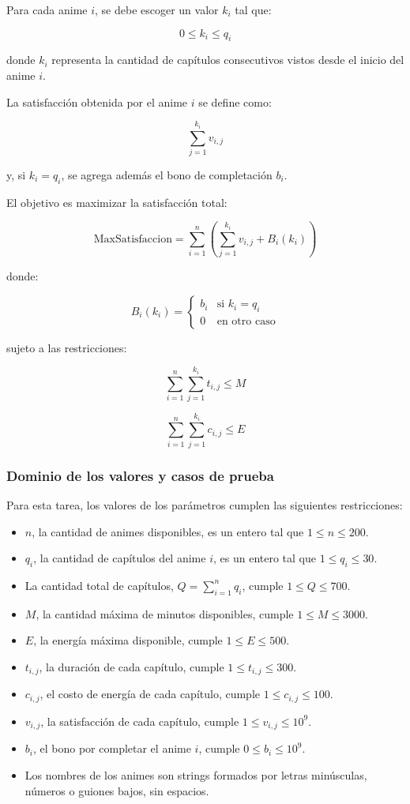 Para cada anime $i$, se debe escoger un valor $k_i$ tal que:

\[
0 \leq k_i \leq q_i
\]

donde $k_i$ representa la cantidad de capítulos consecutivos vistos desde el inicio del anime $i$.

La satisfacción obtenida por el anime $i$ se define como:

\[
\sum_{j=1}^{k_i} v_{i,j}
\]

y, si $k_i = q_i$, se agrega además el bono de completación $b_i$.

El objetivo es maximizar la satisfacción total:

\[
\text{MaxSatisfaccion}
=
\sum_{i=1}^{n}
\left(
\sum_{j=1}^{k_i} v_{i,j}
+
B_i(k_i)
\right)
\]

donde:

\[
B_i(k_i)=
\begin{cases}
b_i & \text{si } k_i=q_i\\
0 & \text{en otro caso}
\end{cases}
\]

sujeto a las restricciones:

\[
\sum_{i=1}^{n}\sum_{j=1}^{k_i} t_{i,j} \leq M
\]

\[
\sum_{i=1}^{n}\sum_{j=1}^{k_i} c_{i,j} \leq E
\]

\subsubsection*{Dominio de los valores y casos de prueba}

Para esta tarea, los valores de los parámetros cumplen las siguientes restricciones:

\begin{itemize}
    \item $n$, la cantidad de animes disponibles, es un entero tal que $1 \leq n \leq 200$.
    \item $q_i$, la cantidad de capítulos del anime $i$, es un entero tal que $1 \leq q_i \leq 30$.
    \item La cantidad total de capítulos, $Q=\sum_{i=1}^{n} q_i$, cumple $1 \leq Q \leq 700$.
    \item $M$, la cantidad máxima de minutos disponibles, cumple $1 \leq M \leq 3000$.
    \item $E$, la energía máxima disponible, cumple $1 \leq E \leq 500$.
    \item $t_{i,j}$, la duración de cada capítulo, cumple $1 \leq t_{i,j} \leq 300$.
    \item $c_{i,j}$, el costo de energía de cada capítulo, cumple $1 \leq c_{i,j} \leq 100$.
    \item $v_{i,j}$, la satisfacción de cada capítulo, cumple $1 \leq v_{i,j} \leq 10^9$.
    \item $b_i$, el bono por completar el anime $i$, cumple $0 \leq b_i \leq 10^9$.
    \item Los nombres de los animes son strings formados por letras minúsculas, números o guiones bajos, sin espacios.
\end{itemize}

